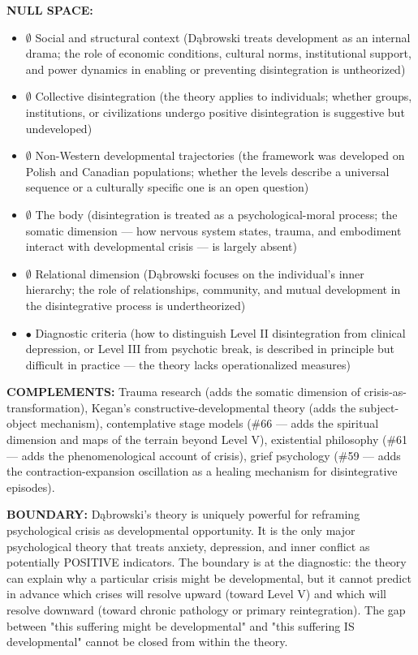 \textbf{NULL SPACE:}

\begin{itemize}[nosep,leftmargin=*]
  \item $\emptyset$ Social and structural context (Dąbrowski treats development as an internal drama; the role of economic conditions, cultural norms, institutional support, and power dynamics in enabling or preventing disintegration is untheorized)
  \item $\emptyset$ Collective disintegration (the theory applies to individuals; whether groups, institutions, or civilizations undergo positive disintegration is suggestive but undeveloped)
  \item $\emptyset$ Non-Western developmental trajectories (the framework was developed on Polish and Canadian populations; whether the levels describe a universal sequence or a culturally specific one is an open question)
  \item $\emptyset$ The body (disintegration is treated as a psychological-moral process; the somatic dimension — how nervous system states, trauma, and embodiment interact with developmental crisis — is largely absent)
  \item $\emptyset$ Relational dimension (Dąbrowski focuses on the individual's inner hierarchy; the role of relationships, community, and mutual development in the disintegrative process is undertheorized)
  \item $\bullet$ Diagnostic criteria (how to distinguish Level II disintegration from clinical depression, or Level III from psychotic break, is described in principle but difficult in practice — the theory lacks operationalized measures)
\end{itemize}


\textbf{COMPLEMENTS:} Trauma research (adds the somatic dimension of crisis-as-transformation), Kegan's constructive-developmental theory (adds the subject-object mechanism), contemplative stage models (\#66 — adds the spiritual dimension and maps of the terrain beyond Level V), existential philosophy (\#61 — adds the phenomenological account of crisis), grief psychology (\#59 — adds the contraction-expansion oscillation as a healing mechanism for disintegrative episodes).


\textbf{BOUNDARY:} Dąbrowski's theory is uniquely powerful for reframing psychological crisis as developmental opportunity. It is the only major psychological theory that treats anxiety, depression, and inner conflict as potentially POSITIVE indicators. The boundary is at the diagnostic: the theory can explain why a particular crisis might be developmental, but it cannot predict in advance which crises will resolve upward (toward Level V) and which will resolve downward (toward chronic pathology or primary reintegration). The gap between "this suffering might be developmental" and "this suffering IS developmental" cannot be closed from within the theory.


